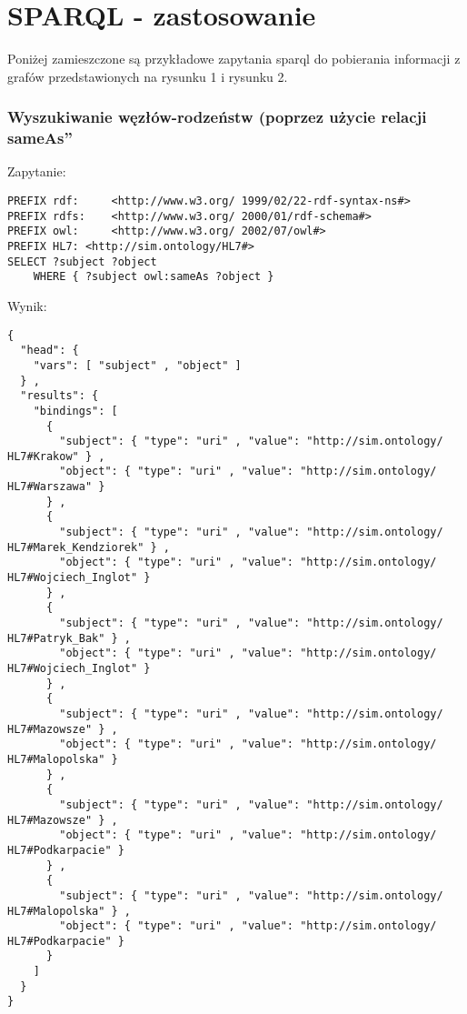 \section{SPARQL - zastosowanie}
\label{cha:wykorzystanie}

Poniżej zamieszczone są przykładowe zapytania sparql do pobierania informacji z grafów przedstawionych na rysunku 1 i rysunku 2.

\subsubsection{Wyszukiwanie węzłów-rodzeństw (poprzez użycie \quotedblbase relacji sameAs\textquotedblright }

Zapytanie:
\begin{lstlisting}
PREFIX rdf:     <http://www.w3.org/ 1999/02/22-rdf-syntax-ns#> 
PREFIX rdfs:    <http://www.w3.org/ 2000/01/rdf-schema#>
PREFIX owl:     <http://www.w3.org/ 2002/07/owl#>
PREFIX HL7: <http://sim.ontology/HL7#>
SELECT ?subject ?object
	WHERE { ?subject owl:sameAs ?object }
\end{lstlisting}

Wynik:
\begin{lstlisting}
{
  "head": {
    "vars": [ "subject" , "object" ]
  } ,
  "results": {
    "bindings": [
      {
        "subject": { "type": "uri" , "value": "http://sim.ontology/ HL7#Krakow" } ,
        "object": { "type": "uri" , "value": "http://sim.ontology/ HL7#Warszawa" }
      } ,
      {
        "subject": { "type": "uri" , "value": "http://sim.ontology/ HL7#Marek_Kendziorek" } ,
        "object": { "type": "uri" , "value": "http://sim.ontology/ HL7#Wojciech_Inglot" }
      } ,
      {
        "subject": { "type": "uri" , "value": "http://sim.ontology/ HL7#Patryk_Bak" } ,
        "object": { "type": "uri" , "value": "http://sim.ontology/ HL7#Wojciech_Inglot" }
      } ,
      {
        "subject": { "type": "uri" , "value": "http://sim.ontology/ HL7#Mazowsze" } ,
        "object": { "type": "uri" , "value": "http://sim.ontology/ HL7#Malopolska" }
      } ,
      {
        "subject": { "type": "uri" , "value": "http://sim.ontology/ HL7#Mazowsze" } ,
        "object": { "type": "uri" , "value": "http://sim.ontology/ HL7#Podkarpacie" }
      } ,
      {
        "subject": { "type": "uri" , "value": "http://sim.ontology/ HL7#Malopolska" } ,
        "object": { "type": "uri" , "value": "http://sim.ontology/ HL7#Podkarpacie" }
      }
    ]
  }
}

\end{lstlisting}







